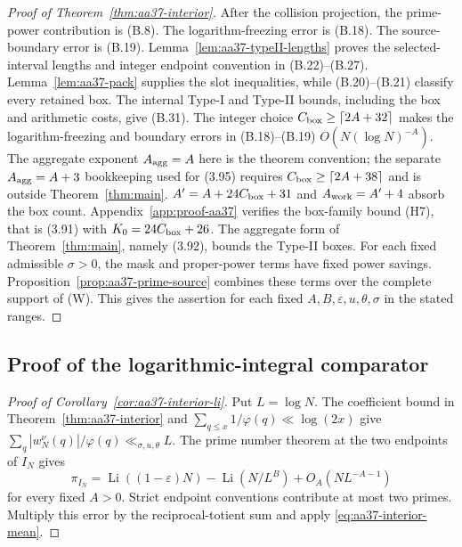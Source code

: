 \begin{proof}[Proof of Theorem~\ref{thm:aa37-interior}]
After the collision projection, the prime-power contribution is
(B.8). The logarithm-freezing error is (B.18). The source-boundary
error is (B.19). Lemma~\ref{lem:aa37-typeII-lengths} proves
the selected-interval lengths and integer endpoint convention in
(B.22)--(B.27). Lemma~\ref{lem:aa37-pack} supplies the slot inequalities, while
(B.20)--(B.21) classify every retained box. The internal Type-I and
Type-II bounds, including the box and arithmetic costs, give (B.31).
The integer choice
$C_{\rm box}\ge\lceil2A+32\rceil$
makes the
logarithm-freezing and boundary errors in (B.18)--(B.19)
$O(N(\log N)^{-A})$. The aggregate exponent
$A_{\rm agg}=A$ here is the theorem convention; the separate
$A_{\rm agg}=A+3$ bookkeeping used for (3.95) requires
$C_{\rm box}\ge\lceil2A+38\rceil$ and is outside Theorem~\ref{thm:main}.
$A'=A+24C_{\rm box}+31$ and $A_{\rm work}=A'+4$ absorb the box count.
Appendix~\ref{app:proof-aa37} verifies the box-family bound (H7), that
is (3.91) with $K_0=24C_{\rm box}+26$. The aggregate form of Theorem~\ref{thm:main}, namely (3.92),
bounds the Type-II boxes. For each fixed admissible $\sigma>0$, the mask and proper-power
terms have fixed power savings.
Proposition~\ref{prop:aa37-prime-source} combines these terms over
the complete support of \textup{(W)}. This gives the assertion for
each fixed $A,B,\varepsilon,u,\theta,\sigma$ in the stated ranges.
\end{proof}

\subsection{Proof of the logarithmic-integral comparator}

\begin{proof}[Proof of Corollary~\ref{cor:aa37-interior-li}]
Put $L=\log N$. The coefficient bound in
Theorem~\ref{thm:aa37-interior} and
$\sum_{q\le x}1/\varphi(q)\ll\log(2x)$ give
$\sum_q|w_N^\nu(q)|/\varphi(q)\ll_{\sigma,u,\theta} L$.
The prime number theorem at the two endpoints of $I_N$ gives
\[
 \pi_{I_N}=\operatorname{Li}((1-\varepsilon)N)
              -\operatorname{Li}(N/L^B)
              +O_A(NL^{-A-1})
\]
for every fixed $A>0$. Strict endpoint conventions contribute at most
two primes. Multiply this error by the reciprocal-totient sum and apply
\eqref{eq:aa37-interior-mean}.
\end{proof}
